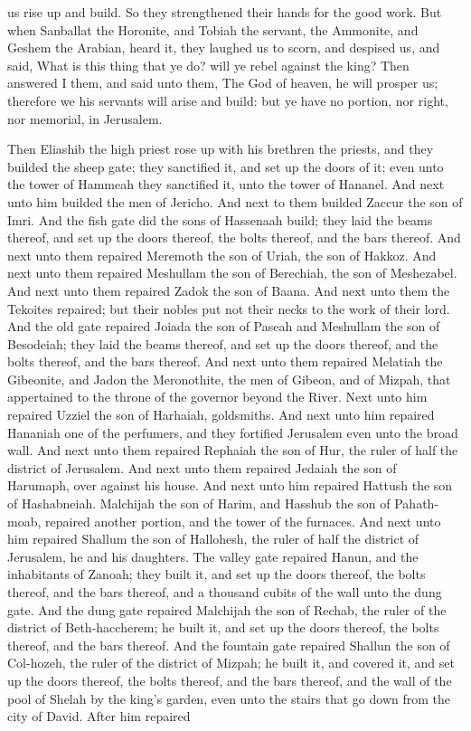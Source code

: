 us rise up and build. So they strengthened their hands for the good work. But when Sanballat the Horonite, and Tobiah the servant, the Ammonite, and Geshem the Arabian, heard it, they laughed us to scorn, and despised us, and said, What is this thing that ye do? will ye rebel against the king? Then answered I them, and said unto them, The God of heaven, he will prosper us; therefore we his servants will arise and build: but ye have no portion, nor right, nor memorial, in Jerusalem. 

Then Eliashib the high priest rose up with his brethren the priests, and they builded the sheep gate; they sanctified it, and set up the doors of it; even unto the tower of Hammeah they sanctified it, unto the tower of Hananel. And next unto him builded the men of Jericho. And next to them builded Zaccur the son of Imri.  And the fish gate did the sons of Hassenaah build; they laid the beams thereof, and set up the doors thereof, the bolts thereof, and the bars thereof. And next unto them repaired Meremoth the son of Uriah, the son of Hakkoz. And next unto them repaired Meshullam the son of Berechiah, the son of Meshezabel. And next unto them repaired Zadok the son of Baana. And next unto them the Tekoites repaired; but their nobles put not their necks to the work of their lord.  And the old gate repaired Joiada the son of Paseah and Meshullam the son of Besodeiah; they laid the beams thereof, and set up the doors thereof, and the bolts thereof, and the bars thereof. And next unto them repaired Melatiah the Gibeonite, and Jadon the Meronothite, the men of Gibeon, and of Mizpah, that appertained to the throne of the governor beyond the River. Next unto him repaired Uzziel the son of Harhaiah, goldsmiths. And next unto him repaired Hananiah one of the perfumers, and they fortified Jerusalem even unto the broad wall. And next unto them repaired Rephaiah the son of Hur, the ruler of half the district of Jerusalem. And next unto them repaired Jedaiah the son of Harumaph, over against his house. And next unto him repaired Hattush the son of Hashabneiah. Malchijah the son of Harim, and Hasshub the son of Pahath-moab, repaired another portion, and the tower of the furnaces. And next unto him repaired Shallum the son of Hallohesh, the ruler of half the district of Jerusalem, he and his daughters.  The valley gate repaired Hanun, and the inhabitants of Zanoah; they built it, and set up the doors thereof, the bolts thereof, and the bars thereof, and a thousand cubits of the wall unto the dung gate.  And the dung gate repaired Malchijah the son of Rechab, the ruler of the district of Beth-haccherem; he built it, and set up the doors thereof, the bolts thereof, and the bars thereof.  And the fountain gate repaired Shallun the son of Col-hozeh, the ruler of the district of Mizpah; he built it, and covered it, and set up the doors thereof, the bolts thereof, and the bars thereof, and the wall of the pool of Shelah by the king’s garden, even unto the stairs that go down from the city of David. After him repaired 